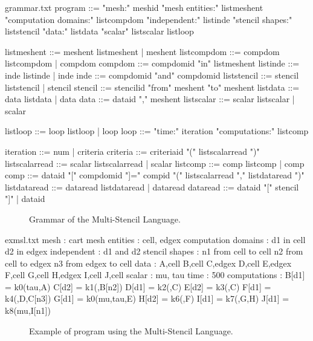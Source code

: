\begin{filecontents*}{grammar.txt}
program ::= "mesh:" meshid 
            "mesh entities:" listmeshent
            "computation domains:" 
                      listcompdom
            "independent:"
                      listinde
            "stencil shapes:"
                      liststencil
            "data:" listdata
            "scalar" listscalar
            listloop

listmeshent ::= meshent listmeshent 
                        |  meshent
listcompdom ::= compdom listcompdom 
                        |  compdom
compdom ::= compdomid "in" listmeshent
listinde ::= inde listinde |  inde
inde ::= compdomid "and" compdomid
liststencil ::= stencil liststencil 
                        | stencil
stencil ::= stencilid "from" meshent "to" meshent
listdata ::= data listdata |  data
data ::= dataid "," meshent
listscalar ::= scalar listscalar 
                      | scalar

listloop ::= loop listloop | loop
loop ::=  "time:" iteration
          "computations:" listcomp
          
iteration ::= num | criteria
criteria ::= criteriaid "(" listscalarread ")"
listscalarread ::= scalar listscalarread 
                          |  scalar
listcomp ::= comp listcomp |  comp
comp ::= dataid "[" compdomid "]=" 
                    compid "({" 
                    listscalarread "},{" 
                    listdataread "})"
listdataread ::= dataread listdataread 
                          |  dataread
dataread ::= dataid "[" stencil "]" 
              |  dataid
\end{filecontents*}

\begin{figure}[!h]
  \hspace{5mm}
  \begin{minipage}[!h]{0.5\textwidth}
    {}   
    \caption{Grammar of the Multi-Stencil Language. \label{fig:grammar}}
  \end{minipage}
\end{figure}

\begin{filecontents*}{exmsl.txt}
mesh : cart
mesh entities : cell, edgex
computation domains :
  d1 in cell
  d2 in edgex
independent :
  d1 and d2
stencil shapes : 
  n1 from cell to cell
  n2 from cell to edgex
  n3 from edgex to cell
data :
  A,cell
  B,cell
  C,edgex
  D,cell
  E,edgex
  F,cell
  G,cell
  H,edgex
  I,cell
  J,cell
scalar : mu, tau
time : 500
computations :
  B[d1] = k0({tau},{A})
  C[d2] = k1({},{B[n2]})
  D[d1] = k2({},{C})
  E[d2] = k3({},{C})
  F[d1] = k4({},{D,C[n3]})
  G[d1] = k0({mu,tau},{E})
  H[d2] = k6({},{F})
  I[d1] = k7({},{G,H})
  J[d1] = k8({mu},{I[n1]})
\end{filecontents*}

\begin{figure}[!h]
  \hspace{5mm}
  \begin{minipage}[!h]{0.4\textwidth}
    {}   
    \caption{Example of program using the Multi-Stencil Language. \label{fig:exmsl}}
  \end{minipage}
\end{figure}